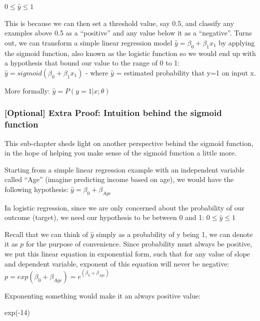 \documentclass[
]{article}
\newenvironment{Shaded}{\begin{snugshade}}{\end{snugshade}}
\newcommand{\DecValTok}[1]{\textcolor[rgb]{0.00,0.00,0.81}{#1}}
\newcommand{\FunctionTok}[1]{\textcolor[rgb]{0.00,0.00,0.00}{#1}}
\newcommand{\NormalTok}[1]{#1}
\newcommand{\SpecialCharTok}[1]{\textcolor[rgb]{0.00,0.00,0.00}{#1}}
\begin{document}
\(0 \leq \hat{y} \leq 1\)

This is because we can then set a threshold value, say 0.5, and classify
any examples above 0.5 as a ``positive'' and any value below it as a
``negative''. Turns out, we can transform a simple linear regression
model \(\hat{y} = \beta_0 + \beta_1x_1\) by applying the sigmoid
function, also known as the logistic function so we would end up with a
hypothesis that bound our value to the range of 0 to 1:
\(\hat{y} = sigmoid( \beta_0 + \beta_1x_1)\) - where \(\hat{y}\) =
estimated probability that y=1 on input x.

More formally: \(\hat{y} = P(y=1 | x;\theta)\)

\hypertarget{optional-extra-proof-intuition-behind-the-sigmoid-function}{%
\subsubsection{{[}Optional{]} Extra Proof: Intuition behind the sigmoid
function}\label{optional-extra-proof-intuition-behind-the-sigmoid-function}}

This sub-chapter sheds light on another perspective behind the sigmoid
function, in the hope of helping you make sense of the sigmoid function
a little more.

Starting from a simple linear regression example with an independent
variable called ``Age'' (imagine predicting income based on age), we
would have the following hypothesis: \(\hat{y} = \beta_0 + \beta_{Age}\)

In logistic regression, since we are only concerned about the
probability of our outcome (target), we need our hypothesis to be
between 0 and 1: \(0 \leq \hat{y} \leq 1\)

Recall that we can think of \(\hat{y}\) simply as a probability of y
being 1, we can denote it as \(p\) for the purpose of convenience. Since
probability must always be positive, we put this linear equation in
exponential form, such that for any value of slope and dependent
variable, exponent of this equation will never be negative:
\(p = exp(\beta_0 + \beta_{Age}) = e^{(\beta_0 + \beta_{Age})}\)

Exponenting something would make it an always positive value:

\begin{Shaded}
\begin{Highlighting}[]
\FunctionTok{exp}\NormalTok{(}\SpecialCharTok{{-}}\DecValTok{14}\NormalTok{)}
\end{Highlighting}
\end{Shaded}
\end{document}
